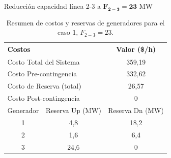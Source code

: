 \begin{frame}{Reducción capacidad línea 2-3 a $\mathbf{F_{2-3}=23}$ MW}
\small
	\begin{table}[H]
		\renewcommand{\arraystretch}{1.3}
		\centering
		\caption{Resumen de costos y reservas de generadores para el caso 1, $F_{2-3}=23$.}
		\label{tab:res_ctos_caso1_23}
		\begin{tabular}{|c|c|c|}
			\hline
			\multicolumn{2}{|l|}{Costos} & Valor (\$/h) \\
			\hline
			\multicolumn{2}{|l|}{Costo Total del Sistema} & 359,19 \\
			\multicolumn{2}{|l|}{Costo Pre-contingencia} & 332,62 \\
			\multicolumn{2}{|l|}{Costo de Reserva (total)} & 26,57 \\
			\multicolumn{2}{|l|}{Costo Post-contingencia} & 0 \\
			\hline \hline
			Generador & Reserva Up (MW) & Reserva Dn (MW) \\
			\hline
			1 & 4,8 & 18,2 \\
			2 & 1,6 & 6,4 \\
			3 & 24,6 & 0 \\
			\hline
		\end{tabular}
	\end{table}

\end{frame}
